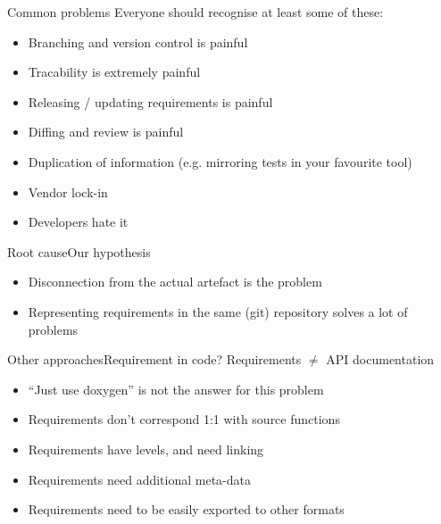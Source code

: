 \documentclass[aspectratio=169]{beamer}
\begin{document}
\begin{frame}{Common problems}
  Everyone should recognise at least some of these:
  \begin{itemize}
  \item Branching and version control is painful
  \item Tracability is extremely painful
  \item Releasing / updating requirements is painful
  \item Diffing and review is painful
  \item Duplication of information (e.g. mirroring tests in your
    favourite tool)
  \item Vendor lock-in
  \item Developers hate it
  \end{itemize}
\end{frame}

\begin{frame}{Root cause}{Our hypothesis}
  \begin{itemize}
  \item Disconnection from the actual artefact is the problem
  \item Representing requirements in the same (git) repository solves
    a lot of problems
  \end{itemize}
\end{frame}

\begin{frame}{Other approaches}{Requirement in code?}
  Requirements $\neq$ API documentation
  \begin{itemize}
  \item ``Just use doxygen'' is not the answer for this problem
  \item Requirements don't correspond 1:1 with source functions
  \item Requirements have levels, and need linking
  \item Requirements need additional meta-data
  \item Requirements need to be easily exported to other formats
  \end{itemize}
\end{frame}

\end{document}
